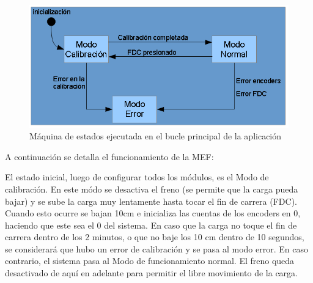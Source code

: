 \begin{figure}[!ht]
	\centering
	\includegraphics[width=16cm,scale=1]{resources/3_31-mefBuclePrincipal.png}
	\caption{Máquina de estados ejecutada en el bucle principal de la aplicación}
	\label{fig:\thefigure}
\end{figure}

A continuación se detalla el funcionamiento de la MEF:

El estado inicial, luego de configurar todos los módulos, es el Modo de calibración. En este módo se desactiva el freno (se permite que la carga pueda bajar) y se sube la carga muy lentamente hasta tocar el fin de carrera (FDC). Cuando esto ocurre se bajan 10cm e inicializa las cuentas de los encoders en 0, haciendo que este sea el 0 del sistema. En caso que la carga no toque el fin de carrera dentro de los 2 minutos, o que no baje los 10 cm dentro de 10 segundos, se considerará que hubo un error de calibración y se pasa al modo error. En caso contrario, el sistema pasa al Modo de funcionamiento normal. El freno queda desactivado de aquí en adelante para permitir el libre movimiento de la carga.

